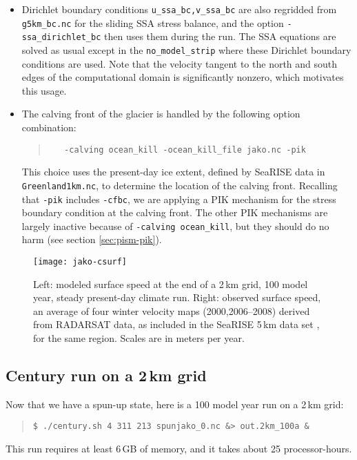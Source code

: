 \begin{itemize}
\item Dirichlet boundary conditions \verb|u_ssa_bc,v_ssa_bc| are also regridded from \verb|g5km_bc.nc| for the sliding SSA stress balance, and the option \verb|-ssa_dirichlet_bc| then uses them during the run.  The SSA equations are solved as usual except in the \verb|no_model_strip| where these Dirichlet boundary conditions are used.  Note that the velocity tangent to the north and south edges of the computational domain is significantly nonzero, which motivates this usage.
\item The calving front of the glacier is handled by the following option combination:
\begin{quote}\small
\begin{verbatim}
   -calving ocean_kill -ocean_kill_file jako.nc -pik
\end{verbatim}
\normalsize\end{quote}
This choice uses the present-day ice extent, defined by SeaRISE data in \verb|Greenland1km.nc|, to determine the location of the calving front.  Recalling that \verb|-pik| includes \verb|-cfbc|, we are applying a PIK mechanism for the stress boundary condition at the calving front.  The other PIK mechanisms are largely inactive because of \verb|-calving ocean_kill|, but they should do no harm (see section \ref{sec:pism-pik}).
\end{itemize}

\begin{figure}[ht]
  \centering
  \texttt{[image: jako-csurf]}
  \caption{Left: modeled surface speed at the end of a 2\,km grid, 100 model year, steady present-day climate run.  Right: observed surface speed, an average of four winter velocity maps (2000,2006--2008) derived from RADARSAT data, as included in the SeaRISE  5\,km data set \cite{Joughinetal2010}, for the same region.  Scales are in meters per year.}
  \label{fig:jako-csurf}
\end{figure}


\subsection*{Century run on a 2\,km grid}
Now that we have a spun-up state, here is a 100 model year run on a 2\,km grid:
\begin{quote}\small
\begin{verbatim}
$ ./century.sh 4 311 213 spunjako_0.nc &> out.2km_100a &
\end{verbatim}
\normalsize\end{quote}
This run requires at least 6\,GB of memory, and it takes about 25 processor-hours.

